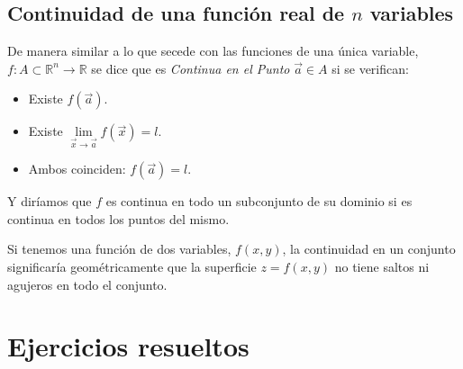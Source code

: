 \subsection*{Continuidad de una función real de $n$ variables}

De manera similar a lo que secede con las funciones de una única
variable, $f: A \subset \mathbb{R}^n  \to \mathbb{R}$ se dice que
es \emph{Continua en el Punto} $\vec a \in A$ si se verifican:

\begin{itemize}
  \item Existe $f\left(\vec a\right)$.
  \item Existe $\mathop {\lim }\limits_{\vec x \to \vec a} f\left( {\vec x}
\right)=l$.

\item Ambos coinciden: $f\left(\vec a\right)=l$.
\end{itemize}

Y diríamos que $f$ es continua en todo un subconjunto de su
dominio si es continua en todos los puntos del mismo.

Si tenemos una función de dos variables, $f(x,y)$, la continuidad
en un conjunto significaría geométricamente que la superficie
$z=f(x,y)$ no tiene saltos ni agujeros en todo el conjunto.





\section{Ejercicios resueltos}

